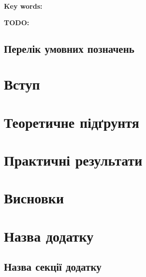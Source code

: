 \documentclass{thesis}
\newcommand{\1}{\mathbb 1}
\newcommand{\todo}[1]{\begin{todobox}[colback=Yellow] \textbf{TODO:} #1 \end{todobox}}
\begin{document}
\bigskip

\noindent
{\bf Key words:} \todo{}


\newpage


\tableofcontents

\newpage

\section*{Перелік умовних позначень}



\newpage

\chapter*{Вступ}\label{Introduction}


\newpage

\chapter{Теоретичне підґрунтя}\label{chapter1}







\newpage

\chapter{Практичні результати}\label{chapter2}





\newpage

\chapter*{Висновки}



\newpage

\renewcommand{\bibname}{Список використаних джерел}

\newpage






\appendix

\chapter{Назва додатку}\label{appendix1}

\section{Назва секції додатку}\label{appendix1.1}
\end{document}
